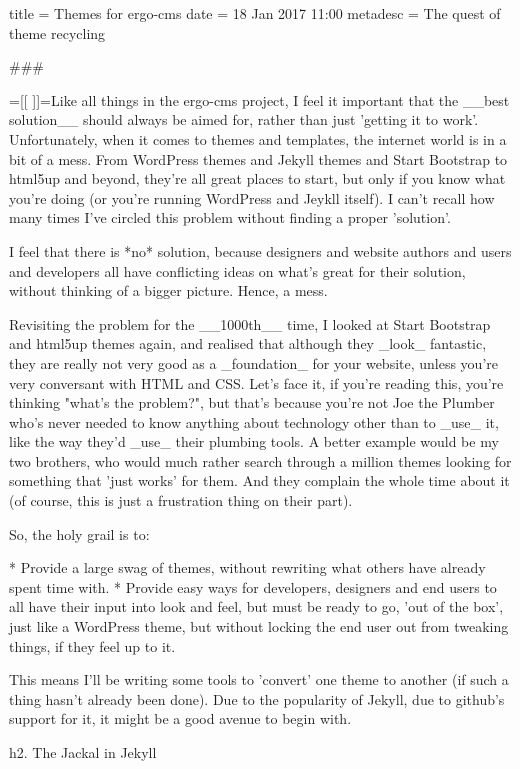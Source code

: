 title = Themes for ergo-cms
date = 18 Jan 2017 11:00
metadesc = The quest of theme recycling

###

{{=[[ ]]=}}Like all things in the ergo-cms project, I feel it important that the __best solution__ should always be aimed for, rather than just 'getting it to work'. Unfortunately, when it comes to themes and templates, the internet world is in a bit of a mess. From WordPress themes and Jekyll themes and Start Bootstrap to html5up and beyond, they're all great places to start, but only if you know what you're doing (or you're running WordPress and Jeykll itself). I can't recall how many times I've circled this problem without finding a proper 'solution'. 

I feel that there is *no* solution, because designers and website authors and users and developers all have conflicting ideas on what's great for their solution, without thinking of a bigger picture. Hence, a mess.

Revisiting the problem for the __1000th__ time, I looked at Start Bootstrap and html5up themes again, and realised that although they _look_ fantastic, they are really not very good as a _foundation_ for your website, unless you're very conversant with HTML and CSS. Let's face it, if you're reading this, you're thinking "what's the problem?", but that's because you're not Joe the Plumber who's never needed to know anything about technology other than to _use_ it, like the way they'd _use_ their plumbing tools. A better example would be my two brothers, who would much rather search through a million themes looking for something that 'just works' for them. And they complain the whole time about it (of course, this is just a frustration thing on their part).

So, the holy grail is to:

* Provide a large swag of themes, without rewriting what others have already spent time with.
* Provide easy ways for developers, designers and end users to all have their input into look and feel, but must be ready to go, 'out of the box', just like a WordPress theme, but without locking the end user out from tweaking things, if they feel up to it.

This means I'll be writing some tools to 'convert' one theme to another (if such a thing hasn't already been done). Due to the popularity of Jekyll, due to github's support for it, it might be a good avenue to begin with.

h2. The Jackal in Jekyll

